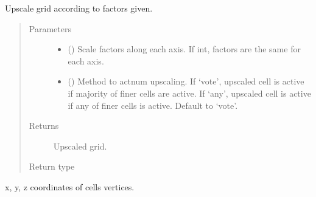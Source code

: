\documentclass[letterpaper,10pt,english]{sphinxmanual}
\begin{document}
\begin{fulllineitems}
\begin{fulllineitems}
\label{\detokenize{api/grids:geology.src.CornerPointGrid.upscale}}
Upscale grid according to factors given.
\begin{quote}\begin{description}
\item[{Parameters}] \leavevmode\begin{itemize}
\item {} 
 (\sphinxstyleliteralemphasis{\sphinxupquote{, }}) \textendash{} Scale factors along each axis. If int, factors are the same for each axis.

\item {} 
 () \textendash{} Method to actnum upscaling. If ‘vote’, upscaled cell is active if majority
of finer cells are active. If ‘any’, upscaled cell is active if any
of finer cells is active. Default to ‘vote’.

\end{itemize}

\item[{Returns}] \leavevmode
{} \textendash{} Upscaled grid.

\item[{Return type}] \leavevmode
{\hyperref[\detokenize{api/grids:geology.src.CornerPointGrid}]{}}

\end{description}\end{quote}

\end{fulllineitems}


\begin{fulllineitems}
\label{\detokenize{api/grids:geology.src.CornerPointGrid.xyz}}
x, y, z coordinates of cells vertices.


\end{fulllineitems}
\end{fulllineitems}
\end{document}
